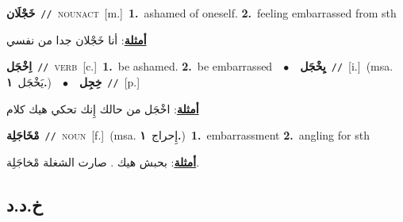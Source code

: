\documentclass[10pt,a4paper,twoside]{article} %
\begin{document}
\begin{multicols}{2}
{{{{{{{\setlength\topsep{0pt}\textbf{\foreignlanguage{arabic}{خَجْلَان}}\ {\color{gray}\texttt{//}\color{black}}\ \textsc{noun\textunderscore act}\ [m.]\ \textbf{1.}~ashamed of oneself.  \textbf{2.}~feeling embarrassed from sth\  \begin{flushright}\color{gray}\foreignlanguage{arabic}{\textbf{\underline{\foreignlanguage{arabic}{أمثلة}}}: أنا خَجْلان جدا من نفسي}\end{flushright}\color{black}} \vspace{2mm}

{\setlength\topsep{0pt}\textbf{\foreignlanguage{arabic}{اِخْجَل}}\ {\color{gray}\texttt{//}\color{black}}\ \textsc{verb}\ [c.]\ \textbf{1.}~be ashamed.  \textbf{2.}~be embarrassed\ \ $\bullet$\ \ \setlength\topsep{0pt}\textbf{\foreignlanguage{arabic}{يِخْجَل}}\ {\color{gray}\texttt{//}\color{black}}\ [i.]\ \color{gray}(msa. \foreignlanguage{arabic}{يَخْجَل}~\foreignlanguage{arabic}{\textbf{١.}})\color{black}\ \ $\bullet$\ \ \setlength\topsep{0pt}\textbf{\foreignlanguage{arabic}{خِجِل}}\ {\color{gray}\texttt{//}\color{black}}\ [p.]\  \begin{flushright}\color{gray}\foreignlanguage{arabic}{\textbf{\underline{\foreignlanguage{arabic}{أمثلة}}}: اخْجَل من حالك إِنك تحكي هيك كلام}\end{flushright}\color{black}} \vspace{2mm}

{\setlength\topsep{0pt}\textbf{\foreignlanguage{arabic}{مْخَاجَلِة}}\ {\color{gray}\texttt{//}\color{black}}\ \textsc{noun}\ [f.]\ \color{gray}(msa. \foreignlanguage{arabic}{إِحراج}~\foreignlanguage{arabic}{\textbf{١.}})\color{black}\ \textbf{1.}~embarrassment  \textbf{2.}~angling for sth\  \begin{flushright}\color{gray}\foreignlanguage{arabic}{\textbf{\underline{\foreignlanguage{arabic}{أمثلة}}}: بحبش هيك . صارت الشغلة مْخاجَلِة.}\end{flushright}\color{black}} \vspace{2mm}

\vspace{-3mm}
\subsection*{\color{blue}\foreignlanguage{arabic}{خ.د.د}\color{blue}{}} 

}}}}}}
\end{multicols}
\end{document}
